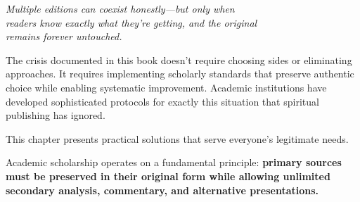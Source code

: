\documentclass[12pt,twoside]{book}
\begin{document}
{\centering\itshape Multiple editions can coexist honestly—but only when\\readers know exactly what they're getting, and the original\\remains forever untouched.\par}
\vspace{0.3cm}

\normalfont\justifying
The crisis documented in this book doesn't require choosing sides or eliminating approaches. It requires implementing scholarly standards that preserve authentic choice while enabling systematic improvement. Academic institutions have developed sophisticated protocols for exactly this situation that spiritual publishing has ignored.

This chapter presents practical solutions that serve everyone's legitimate needs.

Academic scholarship operates on a fundamental principle: \textbf{\textbf{primary sources must be preserved in their original form while allowing unlimited secondary analysis, commentary, and alternative presentations.}}
\end{document}
